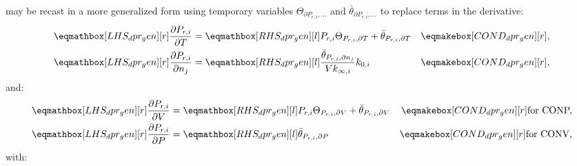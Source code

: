 \documentclass[12pt]{article}
\newcommand{\conp}{CONP}
\newcommand{\conv}{CONV}
\newcommand{\dconp}{\ifmmode\text{for \conp,}\else for \conp,\fi}
\newcommand{\dconv}{\ifmmode\text{for \conv,}\else for \conv,\fi}
\begin{document}
 may be recast in a more generalized form using temporary variables $\Theta_{\partial P_{r, i}, \ldots}$ and $\bar{\theta}_{\partial P_{r, i}, \ldots}$ to replace terms in the derivative:
\begin{align}
 \lhs{dpr_gen}{\frac{\partial P_{r, i} }{\partial T } } &= \rhs{dpr_gen}{P_{r, i} \Theta_{P_{r,i}, \partial T} + \bar{\theta}_{P_{r, i}, \partial T}} & \cond{dpr_gen}{,} \label{e:dpr_dt} \\
 \lhs{dpr_gen}{\frac{\partial P_{r, i} }{\partial n_j}} &= \rhs{dpr_gen}{\frac{\bar{\theta}_{P_{r, i}, \partial n_j}}{V k_{\infty, i}} k_{0, i}} & \cond{dpr_gen}{,} \label{e:dpr_dnj}
\end{align}
and:
\begin{subequations}
 \label{e:dpr_de}
 \begin{align}
  \lhs{dpr_gen}{\frac{\partial P_{r, i} }{\partial V}} &= \rhs{dpr_gen}{P_{r, i} \Theta_{P_{r,i}, \partial V} + \bar{\theta}_{P_{r, i}, \partial V}} & \cond{dpr_gen}{\dconp} \\
  \lhs{dpr_gen}{\frac{\partial P_{r, i} }{\partial P}} &= \rhs{dpr_gen}{\bar{\theta}_{P_{r, i}, \partial P}} & \cond{dpr_gen}{\dconv}
 \end{align}
\end{subequations}
with:
\end{document}
